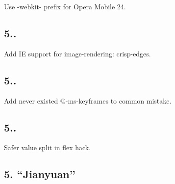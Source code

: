 \begin{DoxyItemize}
\item Use {\ttfamily -\/webkit-\/} prefix for Opera Mobile 24.
\end{DoxyItemize}

\subsection*{5..}


\begin{DoxyItemize}
\item Add IE support for {\ttfamily image-\/rendering\+: crisp-\/edges}.
\end{DoxyItemize}

\subsection*{5..}


\begin{DoxyItemize}
\item Add never existed {\ttfamily @-\/ms-\/keyframes} to common mistake.
\end{DoxyItemize}

\subsection*{5..}


\begin{DoxyItemize}
\item Safer value split in {\ttfamily flex} hack.
\end{DoxyItemize}

\subsection*{5. “\+Jianyuan”}


